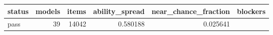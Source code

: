 \begin{tabular}{lrrrrl}
\toprule
status & models & items & ability\_spread & near\_chance\_fraction & blockers \\
\midrule
pass & 39 & 14042 & 0.580188 & 0.025641 &  \\
\bottomrule
\end{tabular}
